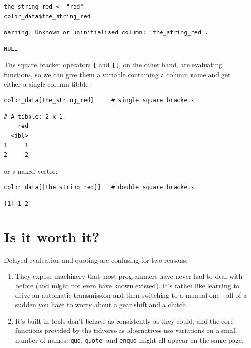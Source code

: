 \begin{lstlisting}
the_string_red <- "red"
color_data$the_string_red
\end{lstlisting}

\begin{lstlisting}
Warning: Unknown or uninitialised column: 'the_string_red'.
\end{lstlisting}

\begin{lstlisting}
NULL
\end{lstlisting}

The square bracket operators \texttt{[} and \texttt{[[},
on the other hand,
are evaluating functions,
so we can give them a variable containing a column name and get either a single-column tibble:

\begin{lstlisting}
color_data[the_string_red]     # single square brackets
\end{lstlisting}

\begin{lstlisting}
# A tibble: 2 x 1
    red
  <dbl>
1     1
2     2
\end{lstlisting}

\noindent
or a naked vector:

\begin{lstlisting}
color_data[[the_string_red]]   # double square brackets
\end{lstlisting}

\begin{lstlisting}
[1] 1 2
\end{lstlisting}

\section{Is it worth it?}

Delayed evaluation and quoting are confusing for two reasons:

\begin{enumerate}
\item
  They expose machinery that most programmers have never had to deal with before (and might not even have known existed).
  It's rather like learning to drive an automatic transmission and then switching to a manual one---all of a sudden
  you have to worry about a gear shift and a clutch.
\item
  R's built-in tools don't behave as consistently as they could,
  and the core functions provided by the tidverse as alternatives use variations on a small number of names:
  \texttt{quo}, \texttt{quote}, and \texttt{enquo} might all appear on the same page.
\end{enumerate}

